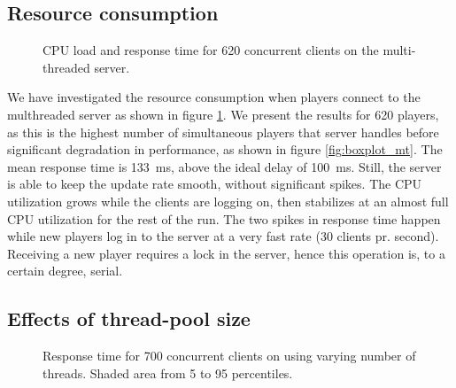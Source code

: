 \subsection{Resource consumption}

\begin{figure}
  \centering %
  \caption{CPU load and response time for 620 concurrent clients on
    the multi-threaded server.}
  \label{fig:cpu-load-620}
\end{figure}

We have investigated the resource consumption when players connect to
the multhreaded server as shown in figure \ref{fig:cpu-load-620}. We
present the results for 620 players, as this is the highest number of
simultaneous players that server handles before significant
degradation in performance, as shown in figure
\ref{fig:boxplot_mt}. The mean response time is 133~ms, above the
ideal delay of 100~ms. Still, the server is able to keep the update
rate smooth, without significant spikes. The CPU utilization grows
while the clients are logging on, then stabilizes at an almost full
CPU utilization for the rest of the run. The two spikes in response
time happen while new players log in to the server at a very fast rate
(30 clients pr. second). Receiving a new player requires a lock in the
server, hence this operation is, to a certain degree, serial.


\subsection{Effects of thread-pool size}

\begin{figure}
  \centering 
     \caption{Response time for 700 concurrent clients on using varying number of threads. Shaded area from 5 to 95 percentiles.}
  \label{fig:line-threads-700}
\end{figure}

